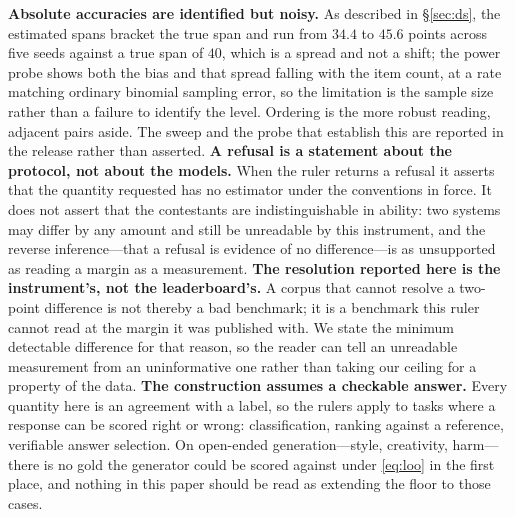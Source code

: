 \documentclass{article}
\begin{document}
\textbf{Absolute accuracies are identified but noisy.} As described in \S\ref{sec:ds}, the estimated spans bracket the true span and run from $34.4$ to $45.6$ points across five seeds against a true span of $40$, which is a spread and not a shift; the power probe shows both the bias and that spread falling with the item count, at a rate matching ordinary binomial sampling error, so the limitation is the sample size rather than a failure to identify the level. Ordering is the more robust reading, adjacent pairs aside. The sweep and the probe that establish this are reported in the release rather than asserted.
\textbf{A refusal is a statement about the protocol, not about the models.} When the ruler returns a refusal it asserts that the quantity requested has no estimator under the conventions in force. It does not assert that the contestants are indistinguishable in ability: two systems may differ by any amount and still be unreadable by this instrument, and the reverse inference---that a refusal is evidence of no difference---is as unsupported as reading a margin as a measurement.
\textbf{The resolution reported here is the instrument's, not the leaderboard's.} A corpus that cannot resolve a two-point difference is not thereby a bad benchmark; it is a benchmark this ruler cannot read at the margin it was published with. We state the minimum detectable difference for that reason, so the reader can tell an unreadable measurement from an uninformative one rather than taking our ceiling for a property of the data.
\textbf{The construction assumes a checkable answer.} Every quantity here is an agreement with a label, so the rulers apply to tasks where a response can be scored right or wrong: classification, ranking against a reference, verifiable answer selection. On open-ended generation---style, creativity, harm---there is no gold the generator could be scored against under \eqref{eq:loo} in the first place, and nothing in this paper should be read as extending the floor to those cases.
\end{document}
